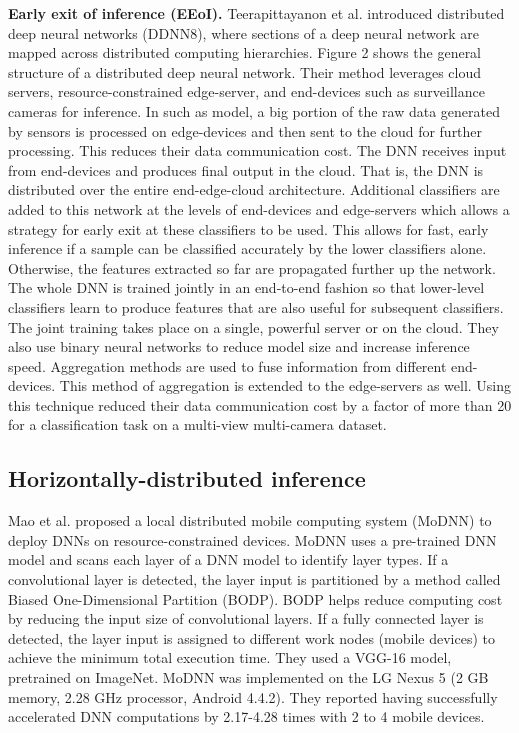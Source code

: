 \documentclass[letterpaper, 10 pt, conference]{ieeeconf}
\begin{document}
\textbf{Early exit of inference (EEoI).} Teerapittayanon et al. introduced distributed deep neural networks (DDNN8), where sections of a deep neural network are mapped across distributed computing hierarchies\cite{Teerapittayanon_McDanel_Kung_2017}. Figure 2 shows the general structure of a distributed deep neural network. Their method leverages cloud servers, resource-constrained edge-server, and end-devices such as surveillance cameras for inference. In such as model, a big portion of the raw data generated by sensors is processed on edge-devices and then sent to the cloud for further processing. This reduces their data communication cost. The DNN receives input from end-devices and produces final output in the cloud. That is, the DNN is distributed over the entire end-edge-cloud architecture. Additional classifiers are added to this network at the levels of end-devices and edge-servers which allows a strategy for early exit at these classifiers to be used. This allows for fast, early inference if a sample can be classified accurately by the lower classifiers alone. Otherwise, the features extracted so far are propagated further up the network. The whole DNN is trained jointly in an end-to-end fashion so that lower-level classifiers learn to produce features that are also useful for subsequent classifiers. The joint training takes place on a single, powerful server or on the cloud. They also use binary neural networks\cite{Courbariaux_Hubara_Soudry_El-Yaniv_Bengio_2016} to reduce model size and increase inference speed. Aggregation methods are used to fuse information from different end-devices. This method of aggregation is extended to the edge-servers as well. Using this technique reduced their data communication cost by a factor of more than 20 for a classification task on a multi-view multi-camera dataset.
\subsection{Horizontally-distributed inference}
Mao et al. proposed a local distributed mobile computing system (MoDNN) to deploy DNNs on resource-constrained devices\cite{Mao_Chen_Nixon_Krieger_Chen_2017}. MoDNN uses a pre-trained DNN model and scans each layer of a DNN model to identify layer types. If a convolutional layer is detected, the layer input is partitioned by a method called Biased One-Dimensional Partition (BODP). BODP helps reduce computing cost by reducing the input size of convolutional layers. If a fully connected layer is detected, the layer input is assigned to different work nodes (mobile devices) to achieve the minimum total execution time. They used a VGG-16 model, pretrained on ImageNet. MoDNN was implemented on the LG Nexus 5 (2 GB memory, 2.28 GHz processor, Android 4.4.2). They reported having successfully accelerated DNN computations by 2.17-4.28 times with 2 to 4 mobile devices.
\end{document}
